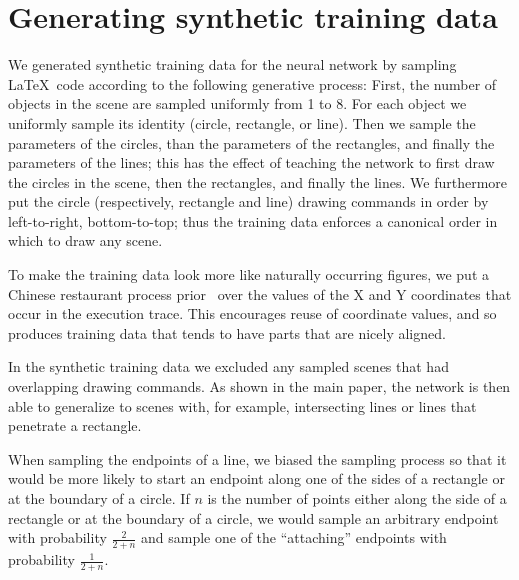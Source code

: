 \documentclass{article}
\begin{document}
\section{Generating synthetic training data}

We generated synthetic training data for the neural network by
sampling \LaTeX~code according to the following generative process:
First,
the number of objects in the scene are sampled uniformly from 1 to 8.
For each object we uniformly sample its identity (circle, rectangle, or line).
Then we sample the parameters of the circles,
than the parameters of the rectangles,
and finally the parameters of the lines;
this has the effect of teaching the network to first draw the circles in the scene,
then the rectangles,
and finally the lines.
We furthermore put the circle (respectively, rectangle and line) drawing commands in order by
left-to-right, bottom-to-top;
thus the training data enforces a canonical order in which to draw any scene.

To make the training data look more like naturally occurring figures,
we put a Chinese restaurant process prior~\cite{gershman2012tutorial} over
the values of the X and Y coordinates that occur in the execution trace.
This encourages reuse of coordinate values,
and so produces training data that tends to have parts that are nicely aligned.

In the synthetic training data we excluded any sampled scenes that had
overlapping drawing commands.  As shown in the main paper, the network
is then able to generalize to scenes with, for example, intersecting
lines or lines that penetrate a rectangle.

When sampling the endpoints of a line,
we biased the sampling process so that it would
be more likely to start an endpoint
along one of the sides of a rectangle or at the boundary of a circle.
If $n$ is the number of points either along the side of a rectangle or at the boundary of a circle,
we would sample an arbitrary endpoint with probability $\frac{2}{2 + n}$
and sample one of the ``attaching'' endpoints with probability $\frac{1}{2 + n}$.
\end{document}
